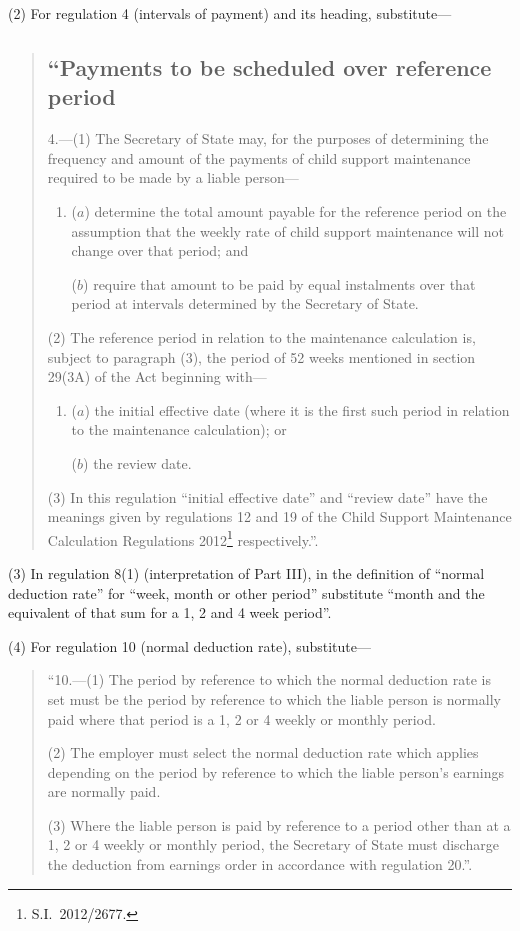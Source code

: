 \documentclass[12pt,a4paper]{article}
\begin{document}
(2) For regulation 4 (intervals of payment) and its heading, substitute—
\begin{quotation}
\subsection*{“Payments to be scheduled over reference period}

4.---(1)  The Secretary of State may, for the purposes of determining the frequency and amount of the payments of child support maintenance required to be made by a liable person—
\begin{enumerate}\item[]
($a$) determine the total amount payable for the reference period on the assumption that the weekly rate of child support maintenance will not change over that period; and

($b$) require that amount to be paid by equal instalments over that period at intervals determined by the Secretary of State.
\end{enumerate}

(2) The reference period in relation to the maintenance calculation is, subject to paragraph (3), the period of 52 weeks mentioned in section 29(3A) of the Act beginning with—
\begin{enumerate}\item[]
($a$) the initial effective date (where it is the first such period in relation to the maintenance calculation); or

($b$) the review date.
\end{enumerate}

(3) In this regulation “initial effective date” and “review date” have the meanings given by regulations 12 and 19 of the Child Support Maintenance Calculation Regulations 2012\footnote{S.I.~2012/2677.} respectively.”.
\end{quotation}

(3) In regulation 8(1) (interpretation of Part III), in the definition of “normal deduction rate” for “week, month or other period” substitute “month and the equivalent of that sum for a 1, 2 and 4 week period”.

(4) For regulation 10 (normal deduction rate), substitute—
\begin{quotation}
“10.---(1)  The period by reference to which the normal deduction rate is set must be the period by reference to which the liable person is normally paid where that period is a 1, 2 or 4 weekly or monthly period.

(2) The employer must select the normal deduction rate which applies depending on the period by reference to which the liable person’s earnings are normally paid.

(3) Where the liable person is paid by reference to a period other than at a 1, 2 or 4 weekly or monthly period, the Secretary of State must discharge the deduction from earnings order in accordance with regulation 20.”.
\end{quotation}
\end{document}
